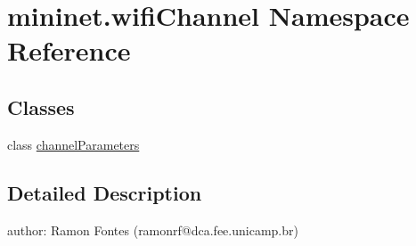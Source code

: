 \hypertarget{namespacemininet_1_1wifiChannel}{\section{mininet.\-wifi\-Channel Namespace Reference}
\label{namespacemininet_1_1wifiChannel}
}
\subsection*{Classes}
\begin{DoxyCompactItemize}
\item 
class \hyperlink{classmininet_1_1wifiChannel_1_1channelParameters}{channel\-Parameters}
\end{DoxyCompactItemize}


\subsection{Detailed Description}
\begin{DoxyVerb}author: Ramon Fontes (ramonrf@dca.fee.unicamp.br)
\end{DoxyVerb}
 
